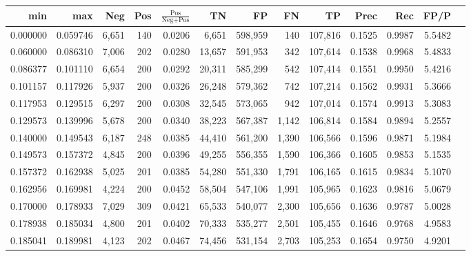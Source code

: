 \begin{tabular}{rrrrrrrrrrrrr}
\toprule
     min &      max &   Neg & Pos & $\frac{\text{Pos}}{\text{Neg}+\text{Pos}}$ &      TN &      FP &      FN &      TP &   Prec &    Rec &   FP/P \\
\midrule
0.000000 & 0.059746 & 6,651 & 140 &                                     0.0206 &   6,651 & 598,959 &     140 & 107,816 & 0.1525 & 0.9987 & 5.5482 \\
0.060000 & 0.086310 & 7,006 & 202 &                                     0.0280 &  13,657 & 591,953 &     342 & 107,614 & 0.1538 & 0.9968 & 5.4833 \\
0.086377 & 0.101110 & 6,654 & 200 &                                     0.0292 &  20,311 & 585,299 &     542 & 107,414 & 0.1551 & 0.9950 & 5.4216 \\
0.101157 & 0.117926 & 5,937 & 200 &                                     0.0326 &  26,248 & 579,362 &     742 & 107,214 & 0.1562 & 0.9931 & 5.3666 \\
0.117953 & 0.129515 & 6,297 & 200 &                                     0.0308 &  32,545 & 573,065 &     942 & 107,014 & 0.1574 & 0.9913 & 5.3083 \\
0.129573 & 0.139996 & 5,678 & 200 &                                     0.0340 &  38,223 & 567,387 &   1,142 & 106,814 & 0.1584 & 0.9894 & 5.2557 \\
0.140000 & 0.149543 & 6,187 & 248 &                                     0.0385 &  44,410 & 561,200 &   1,390 & 106,566 & 0.1596 & 0.9871 & 5.1984 \\
0.149573 & 0.157372 & 4,845 & 200 &                                     0.0396 &  49,255 & 556,355 &   1,590 & 106,366 & 0.1605 & 0.9853 & 5.1535 \\
0.157372 & 0.162938 & 5,025 & 201 &                                     0.0385 &  54,280 & 551,330 &   1,791 & 106,165 & 0.1615 & 0.9834 & 5.1070 \\
0.162956 & 0.169981 & 4,224 & 200 &                                     0.0452 &  58,504 & 547,106 &   1,991 & 105,965 & 0.1623 & 0.9816 & 5.0679 \\
0.170000 & 0.178933 & 7,029 & 309 &                                     0.0421 &  65,533 & 540,077 &   2,300 & 105,656 & 0.1636 & 0.9787 & 5.0028 \\
0.178938 & 0.185034 & 4,800 & 201 &                                     0.0402 &  70,333 & 535,277 &   2,501 & 105,455 & 0.1646 & 0.9768 & 4.9583 \\
0.185041 & 0.189981 & 4,123 & 202 &                                     0.0467 &  74,456 & 531,154 &   2,703 & 105,253 & 0.1654 & 0.9750 & 4.9201 \\

\end{tabular}
